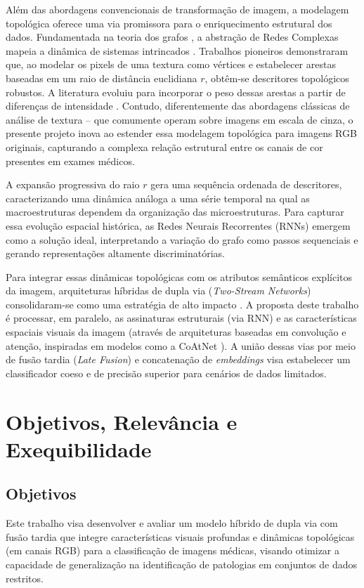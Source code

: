 \documentclass[a4paper,12pt]{article}
\begin{document}
Além das abordagens convencionais de transformação de imagem, a modelagem topológica oferece uma via promissora para o enriquecimento estrutural dos dados. Fundamentada na teoria dos grafos \cite{euler1736solutio}, a abstração de Redes Complexas mapeia a dinâmica de sistemas intrincados \cite{BOCCALETTI2006175}. Trabalhos pioneiros \cite{BACKES2013168} demonstraram que, ao modelar os pixels de uma textura como vértices e estabelecer arestas baseadas em um raio de distância euclidiana $r$, obtêm-se descritores topológicos robustos. A literatura evoluiu para incorporar o peso dessas arestas a partir de diferenças de intensidade \cite{RIBAS2020107189}. Contudo, diferentemente das abordagens clássicas de análise de textura -- que comumente operam sobre imagens em escala de cinza, o presente projeto inova ao estender essa modelagem topológica para imagens RGB originais, capturando a complexa relação estrutural entre os canais de cor presentes em exames médicos.

A expansão progressiva do raio $r$ gera uma sequência ordenada de descritores, caracterizando uma dinâmica análoga a uma série temporal na qual as macroestruturas dependem da organização das microestruturas. Para capturar essa evolução espacial histórica, as Redes Neurais Recorrentes (RNNs) \cite{hochreiter1997long, cho2014learning} emergem como a solução ideal, interpretando a variação do grafo como passos sequenciais e gerando representações altamente discriminatórias.

Para integrar essas dinâmicas topológicas com os atributos semânticos explícitos da imagem, arquiteturas híbridas de dupla via (\textit{Two-Stream Networks}) consolidaram-se como uma estratégia de alto impacto \cite{simonyan2014two}. A proposta deste trabalho é processar, em paralelo, as assinaturas estruturais (via RNN) e as características espaciais visuais da imagem (através de arquiteturas baseadas em convolução e atenção, inspiradas em modelos como a CoAtNet \cite{dai2021coatnet}). A união dessas vias por meio de fusão tardia (\textit{Late Fusion}) e concatenação de \textit{embeddings} visa estabelecer um classificador coeso e de precisão superior para cenários de dados limitados.

\section{Objetivos, Relevância e Exequibilidade}

\subsection{Objetivos}
Este trabalho visa desenvolver e avaliar um modelo híbrido de dupla via com fusão tardia que integre características visuais profundas e dinâmicas topológicas (em canais RGB) para a classificação de imagens médicas, visando otimizar a capacidade de generalização na identificação de patologias em conjuntos de dados restritos.
\end{document}
